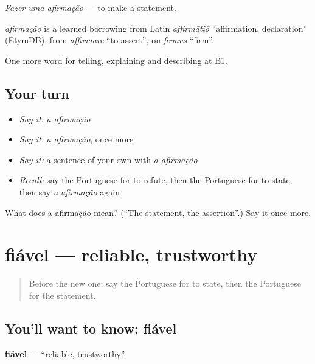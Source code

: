 \emph{Fazer uma afirmação} — to make a statement.

\begin{cousinweb}
\emph{afirmação} is a learned borrowing from Latin \emph{affirmātiō} \textquotedblleft{}affirmation, declaration\textquotedblright{} (EtymDB), from \emph{affirmāre} \textquotedblleft{}to assert\textquotedblright{}, on \emph{firmus} \textquotedblleft{}firm\textquotedblright{}.
\end{cousinweb}

\begin{grammarlens}[title={What you've built}]
One more word for telling, explaining and describing at B1.
\end{grammarlens}

\subsection*{Your turn}
\begin{itemize}
\raggedright
  \item \emph{Say it:} \emph{a afirmação}
  \item \emph{Say it:} \emph{a afirmação}, once more
  \item \emph{Say it:} a sentence of your own with \emph{a afirmação}
  \item \emph{Recall:} say the Portuguese for to refute, then the Portuguese for to state, then say \emph{a afirmação} again
\end{itemize}

\begin{tcolorbox}[breakable,colback=teal!4,colframe=teal!35!black,title={Before you move on}]
What does a afirmação mean? (\textquotedblleft{}The statement, the assertion\textquotedblright{}.) Say it once more.
\end{tcolorbox}
\section[fiável]{fiável — reliable, trustworthy}

\label{lesson:PT-C342-fiavel}



\begin{quote}
Before the new one: say the Portuguese for to state, then the Portuguese for the statement.
\end{quote}

\subsection*{You'll want to know: fiável}
\textbf{fiável} — \textquotedblleft{}reliable, trustworthy\textquotedblright{}.

